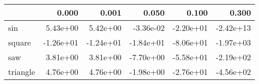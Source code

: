 \begin{tabular}{lrrrrr}
\toprule
{} &     0.000 &     0.001 &     0.050 &     0.100 &     0.300 \\
\midrule
sin      &  5.43e+00 &  5.42e+00 & -3.36e-02 & -2.20e+01 & -2.42e+13 \\
square   & -1.26e+01 & -1.24e+01 & -1.84e+01 & -8.06e+01 & -1.97e+03 \\
saw      &  3.81e+00 &  3.81e+00 & -7.70e+00 & -5.58e+01 & -2.19e+02 \\
triangle &  4.76e+00 &  4.76e+00 & -1.98e+00 & -2.76e+01 & -4.56e+02 \\
\bottomrule
\end{tabular}
